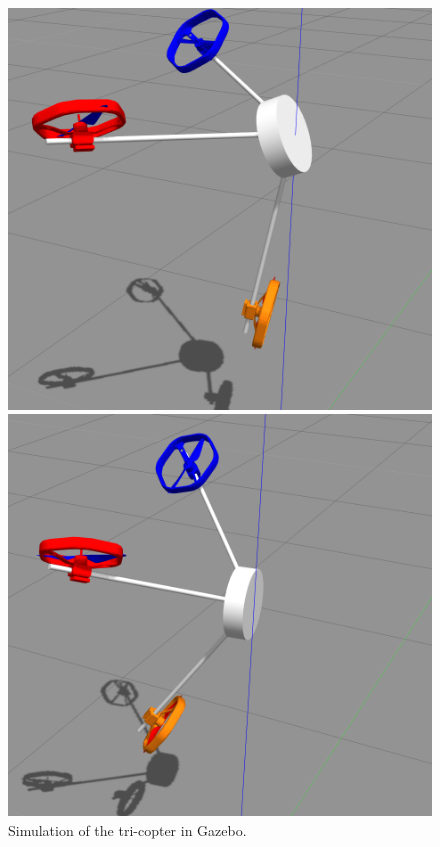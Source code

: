 \begin{figure}[!ht]
\begin{center}
\begin{minipage}[t]{0.24\textwidth}
  \end{minipage}
  \hfill
  \begin{minipage}[t]{0.24\textwidth}
    \centering
    \includegraphics[width=\linewidth]{images/tri_sim3.png}
  \end{minipage}
  \hfill
  \begin{minipage}[t]{0.24\textwidth}
    \centering
    \includegraphics[width=\linewidth]{images/tri_sim4.png}
  \end{minipage}
  \caption{Simulation of the tri-copter in Gazebo.}
  \label{fig:tri_sim}
  \end{center}
\end{figure}


